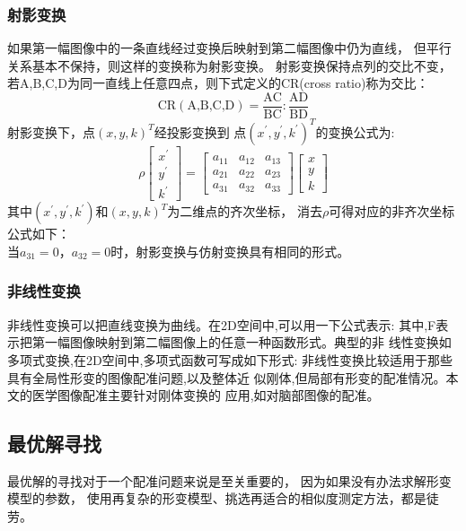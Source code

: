 \subsubsection{射影变换}
如果第一幅图像中的一条直线经过变换后映射到第二幅图像中仍为直线，
但平行关系基本不保持，则这样的变换称为射影变换。
射影变换保持点列的交比不变，
若A,B,C,D为同一直线上任意四点，则下式定义的CR(cross ratio)称为交比：
\begin{equation}
  \text{CR}(\text{A,B,C,D})=
  \frac{\text{AC}}{\text{BC}}:\frac{\text{AD}}{\text{BD}}
\end{equation}
射影变换下，点$(x,y,k)^T$经投影变换到
点$(x^\prime,y^\prime,k^\prime)^T$的变换公式为:
\begin{equation}
  \rho
  \begin{bmatrix}
    x^\prime\\y^\prime\\k^\prime
  \end{bmatrix}=
  \begin{bmatrix}
    a_{11}& a_{12}& a_{13}\\
    a_{21}& a_{22}& a_{23}\\
    a_{31}& a_{32}& a_{33}
  \end{bmatrix}
  \begin{bmatrix}
    x\\y\\k
  \end{bmatrix}
\end{equation}
其中$(x^\prime,y^\prime,k^\prime)$和$(x,y,k)^T$为二维点的齐次坐标，
消去$\rho$可得对应的非齐次坐标公式如下：
\begin{equation}
\end{equation}
当$a_{31}=0$，$a_{32}=0$时，射影变换与仿射变换具有相同的形式。
\subsubsection{非线性变换}
非线性变换可以把直线变换为曲线。在2D空间中,可以用一下公式表示:
其中,F表示把第一幅图像映射到第二幅图像上的任意一种函数形式。典型的非
线性变换如多项式变换,在2D空间中,多项式函数可写成如下形式:
非线性变换比较适用于那些具有全局性形变的图像配准问题,以及整体近
似刚体,但局部有形变的配准情况。本文的医学图像配准主要针对刚体变换的
应用,如对脑部图像的配准。

\subsection{最优解寻找}\label{SectionOptimization}
最优解的寻找对于一个配准问题来说是至关重要的，
因为如果没有办法求解形变模型的参数，
使用再复杂的形变模型、挑选再适合的相似度测定方法，都是徒劳。

